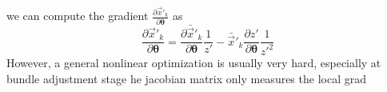 we can compute the gradient $\frac{\partial\vec{x}'_k}{\partial\bm{\theta}}$ as
\begin{equation}
  \label{eq:dxdtheta}
\frac{\partial\vec{x}'_k}{\partial\bm{\theta}}=\frac{\partial\bar{\vec{x}}'_k}{\partial\bm{\theta}}\frac{1}{z'}-\bar{\vec{x}}'_k\frac{\partial z'}{\partial\bm{\theta}}\frac{1}{z'^2}
\end{equation}
However, a general nonlinear optimization is
usually very hard, especially at bundle adjustment stage he jacobian
matrix only measures the local grad
